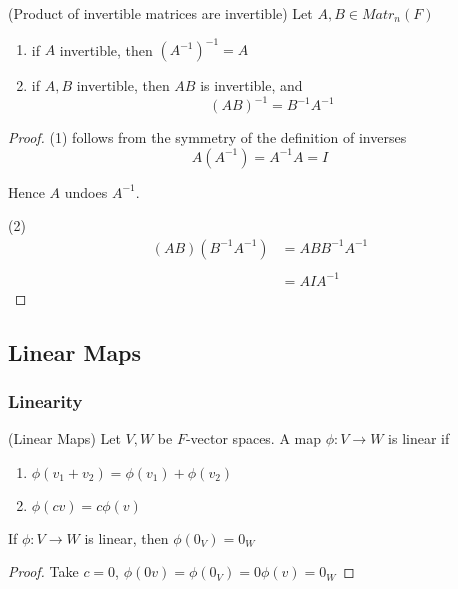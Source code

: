\begin{theorem}
    (Product of invertible matrices are invertible)
    Let $A, B \in Matr_n(F)$
    \begin{enumerate}
        \item if $A$ invertible, then $(A^{-1})^{-1} = A$
        \item if $A, B$ invertible, then $AB$ is invertible, and 
        \[
            (AB)^{-1} = B^{-1}A^{-1}
        \]
    \end{enumerate}
\end{theorem}

\begin{proof}

    (1) follows from the symmetry of the definition of inverses 
    \[
        A (A^{-1}) = A^{-1}A = I
    \]

    Hence $A$ undoes $A^{-1}$.

    (2) 
    \begin{align*}
        (AB)(B^{-1}A^{-1}) &= AB B^{-1} A^{-1} \\ \\
        &= AI A^{-1}
    \end{align*}
\end{proof}

\subsection{Linear Maps}

\subsubsection{Linearity}
\begin{definition}
(Linear Maps) Let $V, W$ be $F$-vector spaces. A map $\phi: V \to W$ is linear if 
\begin{enumerate}
    \item $\phi(v_1 + v_2) = \phi(v_1) + \phi(v_2)$
    \item $\phi(cv) = c \phi(v)$
\end{enumerate} 
\end{definition}

\begin{remark}
    If $\phi: V \to W$ is linear, then $\phi(0_V)= 0_W $
\end{remark}
\begin{proof}
    Take $c = 0$, $\phi(0 v) = \phi(0_V) = 0 \phi(v) = 0_W$
\end{proof}

